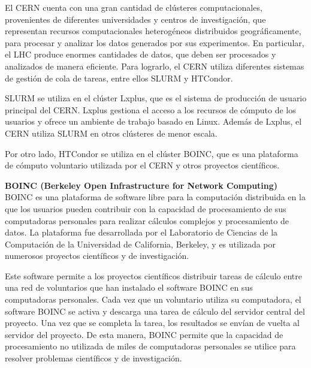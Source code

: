 \begin{doublespace}
\begin{multicols}{2}
  El CERN cuenta con una gran cantidad de clústeres computacionales, provenientes de diferentes universidades y centros de investigación, que representan recursos computacionales heterogéneos distribuidos geográficamente, para procesar y analizar los datos generados por sus experimentos. En particular, el LHC produce enormes cantidades de datos, que deben ser procesados y analizados de manera eficiente. Para lograrlo, el CERN utiliza diferentes sistemas de gestión de cola de tareas, entre ellos SLURM y HTCondor.

  SLURM se utiliza en el clúster Lxplus, que es el sistema de producción de usuario principal del CERN. Lxplus gestiona el acceso a los recursos de cómputo de los usuarios y ofrece un ambiente de trabajo basado en Linux. Además de Lxplus, el CERN utiliza SLURM en otros clústeres de menor escala.

  Por otro lado, HTCondor se utiliza en el clúster BOINC, que es una plataforma de cómputo voluntario utilizada por el CERN y otros proyectos científicos.

  \textbf{BOINC (Berkeley Open Infrastructure for Network Computing)}
  \newline
  BOINC es una plataforma de software libre para la computación distribuida en la que los usuarios pueden contribuir con la capacidad de procesamiento de sus computadoras personales para realizar cálculos complejos y procesamiento de datos. La plataforma fue desarrollada por el Laboratorio de Ciencias de la Computación de la Universidad de California, Berkeley, y es utilizada por numerosos proyectos científicos y de investigación.

  Este software permite a los proyectos científicos distribuir tareas de cálculo entre una red de voluntarios que han instalado el software BOINC en sus computadoras personales. Cada vez que un voluntario utiliza su computadora, el software BOINC se activa y descarga una tarea de cálculo del servidor central del proyecto. Una vez que se completa la tarea, los resultados se envían de vuelta al servidor del proyecto. De esta manera, BOINC permite que la capacidad de procesamiento no utilizada de miles de computadoras personales se utilice para resolver problemas científicos y de investigación.


\end{multicols}
\end{doublespace}
